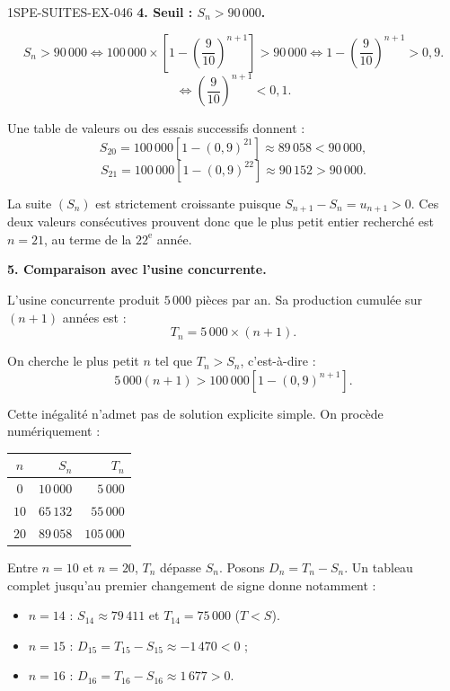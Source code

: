 \begin{corrige}{1SPE-SUITES-EX-046}
\textbf{4. Seuil : $S_n > 90\,000$.}


\[
S_n > 90\,000 \iff 100\,000 \times \left[1 - \left(\frac{9}{10}\right)^{n+1}\right] > 90\,000 \iff 1 - \left(\frac{9}{10}\right)^{n+1} > 0{,}9.
\]
\[
\iff \left(\frac{9}{10}\right)^{n+1} < 0{,}1.
\]

Une table de valeurs ou des essais successifs donnent :
\[
S_{20}=100\,000\left[1-(0{,}9)^{21}\right]\approx89\,058<90\,000,
\]
\[
S_{21}=100\,000\left[1-(0{,}9)^{22}\right]\approx90\,152>90\,000.
\]

La suite $(S_n)$ est strictement croissante puisque $S_{n+1}-S_n=u_{n+1}>0$. Ces deux valeurs consécutives prouvent donc que le plus petit entier recherché est $\boxed{n=21}$, au terme de la $22^\text{e}$ année.

\textbf{5. Comparaison avec l'usine concurrente.}


L'usine concurrente produit $5\,000$ pièces par an. Sa production cumulée sur $(n+1)$ années est :
\[
T_n = 5\,000 \times (n + 1).
\]

On cherche le plus petit $n$ tel que $T_n > S_n$, c'est-à-dire :
\[
5\,000(n+1) > 100\,000\left[1 - (0{,}9)^{n+1}\right].
\]

Cette inégalité n'admet pas de solution explicite simple. On procède numériquement :

\begin{center}
\begin{tabular}{|c|r|r|}
\hline
$n$ & $S_n$ & $T_n$ \\
\hline
$0$ & $10\,000$ & $5\,000$ \\
$10$ & $65\,132$ & $55\,000$ \\
$20$ & $89\,058$ & $105\,000$ \\
\hline
\end{tabular}
\end{center}

Entre $n=10$ et $n=20$, $T_n$ dépasse $S_n$. Posons $D_n=T_n-S_n$. Un tableau complet jusqu'au premier changement de signe donne notamment :

\begin{itemize}
  \item $n = 14$ : $S_{14} \approx 79\,411$ et $T_{14} = 75\,000$ ($T < S$).
  \item $n = 15$ : $D_{15}=T_{15}-S_{15}\approx-1\,470<0$ ;
  \item $n = 16$ : $D_{16}=T_{16}-S_{16}\approx1\,677>0$. \checkmark
\end{itemize}


\end{corrige}
